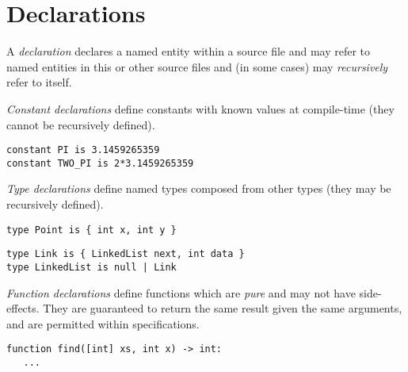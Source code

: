 \documentclass[a4paper,10pt,twcolumn]{article}
\begin{document}


\section*{Declarations}
A {\em declaration} declares a named entity within a source file and may refer to named entities in this or other source files and (in some cases) may {\em recursively} refer to itself.

{\em Constant declarations} define constants with known values at compile-time (they cannot be recursively defined).

\begin{lstlisting}
constant PI is 3.1459265359
constant TWO_PI is 2*3.1459265359
\end{lstlisting}

{\em Type declarations} define named types composed from other types (they may be recursively defined).

\begin{lstlisting}
type Point is { int x, int y }
\end{lstlisting}

\begin{lstlisting}
type Link is { LinkedList next, int data }
type LinkedList is null | Link
\end{lstlisting}

{\em Function declarations} define functions which are {\em pure} and may not have side-effects.  They are guaranteed to return the same result given the same arguments, and are permitted within specifications. 

\begin{lstlisting}
function find([int] xs, int x) -> int:
   ...
\end{lstlisting}
\end{document}

